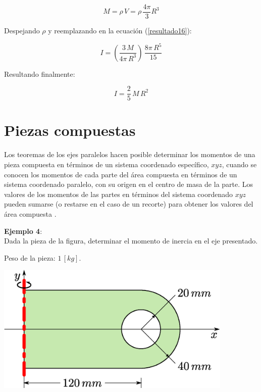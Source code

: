 \documentclass[letter,oneside,11pt]{article}
\begin{document}
\begin{equation*}
    M = \rho\, V = \rho\, \frac{4\pi}{3} R^3
\end{equation*}

Despejando $\rho$ y reemplazando en la ecuación (\ref{resultado16}):

\begin{equation*}
    I = (\frac{3\, M}{4\pi\, R^3})\, \frac{8\pi\, R^5}{15}
\end{equation*}

Resultando finalmente:

\begin{equation}
    I = \frac{2}{5}\, M\, R^2
\end{equation}

\section{Piezas compuestas}
Los teoremas de los ejes paralelos hacen posible determinar los momentos de una
pieza compuesta en términos de un sistema coordenado específico, $xyz$, cuando
se conocen los momentos de cada parte del área compuesta en términos de un
sistema coordenado paralelo, con su origen en el centro de masa de la parte.
Los valores de los momentos de las partes en términos del sistema coordenado
$xyz$ pueden sumarse (o restarse en el caso de un recorte) para obtener los
valores del área compuesta \cite{Fowler}.

\begin{minipage}[c]{.4\linewidth}
\textbf{Ejemplo 4}:\\
Dada la pieza de la figura, determinar el momento de inercia en el eje
presentado.

Peso de la pieza: $1\, [kg]$.

\end{minipage}\hfill
\begin{minipage}{.5\linewidth}
\includegraphics[width=0.85\textwidth]{resources/f22.eps}
\end{minipage}
\\
\\
\end{document}
